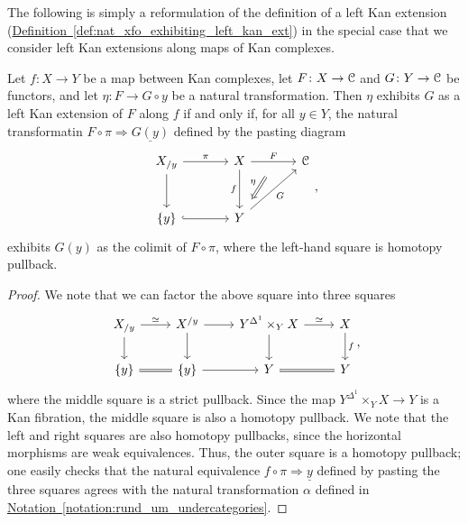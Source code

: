 \documentclass[main.tex]{subfiles}
\begin{document}
The following is simply a reformulation of the definition of a left Kan extension (\hyperref[def:nat_xfo_exhibiting_left_kan_ext]{Definition~\ref*{def:nat_xfo_exhibiting_left_kan_ext}}) in the special case that we consider left Kan extensions along maps of Kan complexes.
\begin{lemma}
  \label{lemma:left_kan_ext_along_kan_complexes}
  Let $f\colon X \to Y$ be a map between Kan complexes, let $F\colon X \to \mathcal{C}$ and $G\colon Y \to \mathcal{C}$ be functors, and let $\eta\colon F \to G \circ y$ be a natural transformation. Then $\eta$ exhibits $G$ as a left Kan extension of $F$ along $f$ if and only if, for all $y \in Y$, the natural transformatin $F \circ \pi \Rightarrow \underline{G(y)}$ defined by the pasting diagram
  \begin{equation*}
    \begin{tikzcd}[row sep=large, column sep=large]
      X_{/y}
      \arrow[r, "\pi", ""{name=LA, swap}]
      \arrow[d, ""{name=LD}]
      & X
      \arrow[d, swap, "f"]
      \arrow[r, "F", ""{below, name=M}]
      & \category{C}
      \\
      \{y\}
      \arrow[r, hook, ""{name=LB}]
      & Y
      \arrow[ur, swap, "G"]
      \arrow[from=M, Rightarrow, shorten=2ex, swap, "\eta"]
    \end{tikzcd},
  \end{equation*}
  exhibits $G(y)$ as the colimit of $F \circ \pi$, where the left-hand square is homotopy pullback.
\end{lemma}
\begin{proof}
  We note that we can factor the above square into three squares
  \begin{equation*}
    \begin{tikzcd}
      X_{/y}
      \arrow[r, "\simeq"]
      \arrow[d]
      & X^{/y}
      \arrow[r]
      \arrow[d]
      & Y^{\Delta^{1}} \times_{Y} X
      \arrow[r, "\simeq"]
      \arrow[d]
      & X
      \arrow[d, "f"]
      \\
      \{y\}
      \arrow[r, equals]
      & \{y\}
      \arrow[r]
      & Y
      \arrow[r, equals]
      & Y
    \end{tikzcd},
  \end{equation*}
  where the middle square is a strict pullback. Since the map $Y^{\Delta^{1}} \times_{Y}X \to Y$ is a Kan fibration, the middle square is also a homotopy pullback. We note that the left and right squares are also homotopy pullbacks, since the horizontal morphisms are weak equivalences. Thus, the outer square is a homotopy pullback; one easily checks that the natural equivalence $f \circ \pi \Rightarrow \underline{y}$ defined by pasting the three squares agrees with the natural transformation $\alpha$ defined in \hyperref[notation:rund_um_undercategories]{Notation~\ref*{notation:rund_um_undercategories}}.
\end{proof}
\end{document}
